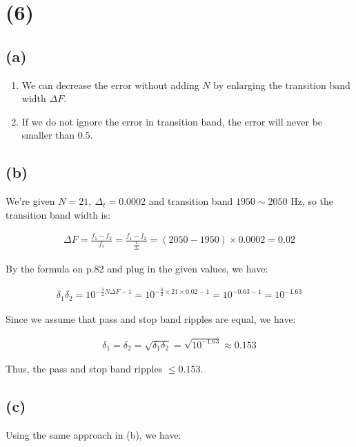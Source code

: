 \documentclass{article}
\begin{document}
\section*{(6)}

\subsection*{(a)}

\begin{enumerate}
    \item We can decrease the error without adding $N$ by enlarging the transition band width $\Delta F$.
    \item If we do not ignore the error in transition band, the error will never be smaller than $0.5$.
\end{enumerate}

\subsection*{(b)}

We're given $N = 21, \ \Delta_t = 0.0002$ and transition band $1950 \sim 2050 \text{ Hz}$,
so the transition band width is:

\begin{align*}
    \Delta F = \frac{f_1 - f_2}{f_s} = \frac{f_1 - f_2}{\frac{1}{\Delta_t}} = (2050 - 1950) \times 0.0002 = 0.02
\end{align*}

By the formula on p.82 and plug in the given values, we have:

\begin{align*}
    \delta_1 \delta_2 = 10^{-\frac{3}{2}N \Delta F - 1} = 10^{-\frac{3}{2} \times 21 \times 0.02 - 1} = 10^{-0.63 - 1} = 10^{-1.63}
\end{align*}

Since we assume that pass and stop band ripples are equal, we have:

\begin{align*}
    \delta_1 = \delta_2 = \sqrt{\delta_1 \delta_2} = \sqrt{10^{-1.63}} \approx 0.153
\end{align*}

Thus, the pass and stop band ripples $\le 0.153$.

\subsection*{(c)}

Using the same approach in (b), we have:
\bigskip
\end{document}

